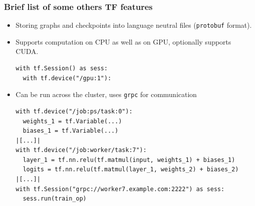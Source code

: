 \documentclass[10pt,utf8]{beamer}
\begin{document}
\begin{frame}[fragile]
	\frametitle{Brief list of some others TF features}
	\vspace{-0.15cm}
	\begin{itemize}
		\item Storing graphs and checkpoints into language neutral files (\texttt{protobuf} format).
		\pause
		\item Supports computation on CPU as well as on GPU, optionally supports CUDA.
			\begin{lstlisting}[style=Python]
with tf.Session() as sess:
  with tf.device("/gpu:1"):
			\end{lstlisting}
		\pause
		\item Can be run across the cluster, uses \texttt{grpc} for communication  
			\begin{lstlisting}[style=Python]
with tf.device("/job:ps/task:0"):
  weights_1 = tf.Variable(...)
  biases_1 = tf.Variable(...)
|[...]|
with tf.device("/job:worker/task:7"):
  layer_1 = tf.nn.relu(tf.matmul(input, weights_1) + biases_1)
  logits = tf.nn.relu(tf.matmul(layer_1, weights_2) + biases_2)
|[...]|
with tf.Session("grpc://worker7.example.com:2222") as sess:
  sess.run(train_op)
			\end{lstlisting}
	\end{itemize}
\end{frame}
\end{document}
